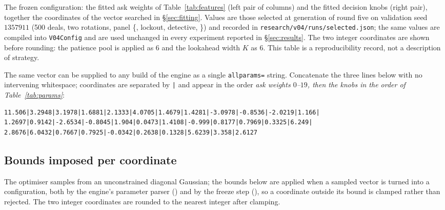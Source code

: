 \begin{table}[ht]
\centering
\caption{The frozen \vfast{} configuration: the \numAskFeats{} fitted ask weights
of Table~\ref{tab:features} (left pair of columns) and the \numKnobs{} fitted decision
knobs (right pair), together the \numParams{} coordinates of the vector searched
in \S\ref{sec:fitting}. Values are those selected at generation
\numSelectedGen{} of round five on validation seed $1357911$ (500 deals, two
rotations, panel \{\vthree{}, lockout, detective, \vtwo{}\}) and recorded in
\texttt{research/v04/runs/selected.json}; the same values are compiled into
\texttt{V04Config} and are used unchanged in every experiment reported in
\S\ref{sec:results}. The two integer coordinates are shown before
rounding: the patience pool is applied as $6$ and the lookahead width $K$ as $6$.
This table is a reproducibility record, not a description of strategy.}
\label{tab:params}
\footnotesize

\end{table}

The same vector can be supplied to any build of the engine as a single
\texttt{allparams=} string. Concatenate the three lines below with no intervening
whitespace; coordinates are separated by \texttt{|} and appear in the order
\emph{ask weights $0$--$19$, then the \numKnobs{} knobs in the order of
Table~\ref{tab:params}}:

{\footnotesize
\begin{verbatim}
11.506|3.2948|3.1978|1.6881|2.1333|4.0705|1.4679|1.4281|-3.0978|-0.8536|-2.0219|1.166|
1.2697|0.9142|-2.6534|-0.8045|1.904|0.0473|1.4108|-0.999|0.8177|0.7969|0.3325|6.249|
2.8676|6.0432|0.7667|0.7925|-0.0342|0.2638|0.1328|5.6239|3.358|2.6127
\end{verbatim}
}

\subsection{Bounds imposed per coordinate}

The optimiser samples from an unconstrained diagonal Gaussian; the bounds below
are applied when a sampled vector is turned into a configuration, both by the
engine's parameter parser () and by the freeze step
(), so a coordinate outside its bound is clamped
rather than rejected. The two integer coordinates are rounded to the nearest
integer after clamping.

